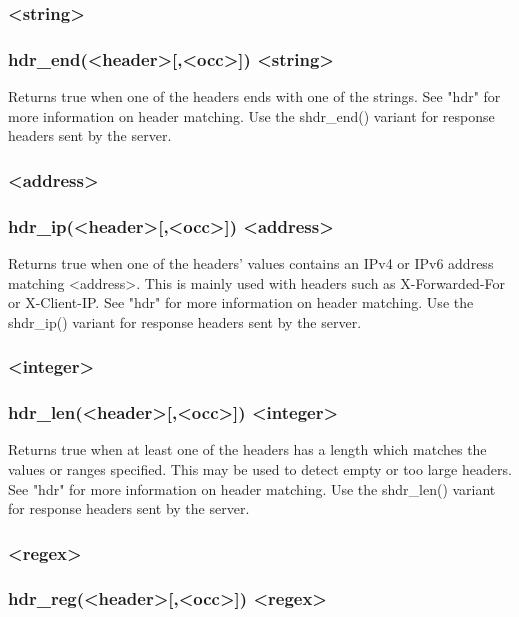 \subsubsection[hdr\_end]{ <string>}
\subsubsection*{hdr\_end(<header>[,<occ>]) <string>}

  Returns true when one of the headers ends with one of the strings. See "hdr"
  for more information on header matching. Use the shdr\_end() variant for
  response headers sent by the server.

\subsubsection[hdr\_ip]{ <address>}
\subsubsection*{hdr\_ip(<header>[,<occ>]) <address>}

  Returns true when one of the headers' values contains an IPv4 or IPv6 address
  matching <address>. This is mainly used with headers such as X-Forwarded-For
  or X-Client-IP. See "hdr" for more information on header matching. Use the
  shdr\_ip() variant for response headers sent by the server.

\subsubsection[hdr\_len]{ <integer>}
\subsubsection*{hdr\_len(<header>[,<occ>]) <integer>}

  Returns true when at least one of the headers has a length which matches the
  values or ranges specified. This may be used to detect empty or too large
  headers. See "hdr" for more information on header matching. Use the
  shdr\_len() variant for response headers sent by the server.

\subsubsection[hdr\_reg]{ <regex>}
\subsubsection*{hdr\_reg(<header>[,<occ>]) <regex>}

